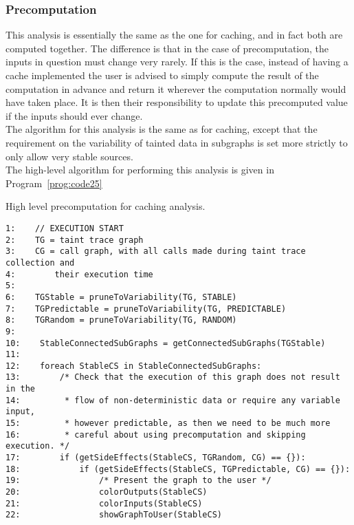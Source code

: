 \documentclass[msc,oneside]{ubcthesis}
\begin{document}
\subsubsection{Precomputation}
This analysis is essentially the same as the one for caching, and in fact both are computed together. The difference is that in the case of precomputation, the inputs in question must change very rarely. If this is the case, instead of having a cache implemented the user is advised to simply compute the result of the computation in advance and return it wherever the computation normally would have taken place. It is then their responsibility to update this precomputed value if the inputs should ever change.\\

The algorithm for this analysis is the same as for caching, except that the requirement on the variability of tainted data in subgraphs is set more strictly to only allow very stable sources.\\

The high-level algorithm for performing this analysis is given in Program~\ref{prog:code25}

\begin{Program}
  \caption{\label{prog:code25} High level precomputation for caching analysis.}
\begin{verbatim}
1:    // EXECUTION START
2:    TG = taint trace graph
3:    CG = call graph, with all calls made during taint trace collection and
4:        their execution time
5:       
6:    TGStable = pruneToVariability(TG, STABLE)
7:    TGPredictable = pruneToVariability(TG, PREDICTABLE)
8:    TGRandom = pruneToVariability(TG, RANDOM)
9:    
10:    StableConnectedSubGraphs = getConnectedSubGraphs(TGStable)
11:    
12:    foreach StableCS in StableConnectedSubGraphs:
13:        /* Check that the execution of this graph does not result in the
14:         * flow of non-deterministic data or require any variable input,
15:         * however predictable, as then we need to be much more
16:         * careful about using precomputation and skipping execution. */
17:        if (getSideEffects(StableCS, TGRandom, CG) == {}):
18:            if (getSideEffects(StableCS, TGPredictable, CG) == {}):
19:                /* Present the graph to the user */
20:                colorOutputs(StableCS)
21:                colorInputs(StableCS)
22:                showGraphToUser(StableCS)
\end{verbatim}
\end{Program}
\end{document}
